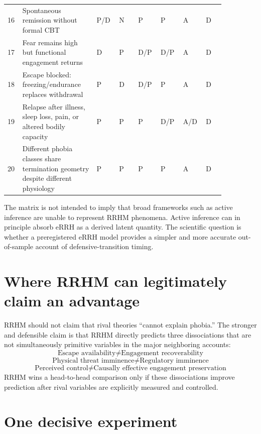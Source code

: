 \documentclass[10pt]{article}
\begin{document}
\begin{landscape}
\begin{longtable}{p{0.045\linewidth}p{0.31\linewidth}p{0.085\linewidth}p{0.085\linewidth}p{0.085\linewidth}p{0.085\linewidth}p{0.085\linewidth}p{0.085\linewidth}}
16 & Spontaneous remission without formal CBT & P/D & N & P & P & A & D \\
17 & Fear remains high but functional engagement returns & D & P & D/P & D/P & A & D \\
18 & Escape blocked: freezing/endurance replaces withdrawal & P & D & D/P & P & A & D \\
19 & Relapse after illness, sleep loss, pain, or altered bodily capacity & P & P & P & D/P & A/D & D \\
20 & Different phobia classes share termination geometry despite different physiology & P & P & P & P & A & D \\
\bottomrule
\end{longtable}
\normalsize
\end{landscape}

The matrix is not intended to imply that broad frameworks such as active inference are unable to represent RRHM phenomena. Active inference can in principle absorb eRRH as a derived latent quantity. The scientific question is whether a preregistered eRRH model provides a simpler and more accurate out-of-sample account of defensive-transition timing.

\section{Where RRHM can legitimately claim an advantage}
RRHM should not claim that rival theories ``cannot explain phobia.'' The stronger and defensible claim is that RRHM directly predicts three dissociations that are not simultaneously primitive variables in the major neighboring accounts:
\[
\boxed{\text{Escape availability}\neq\text{Engagement recoverability}}
\]
\[
\boxed{\text{Physical threat imminence}\neq\text{Regulatory imminence}}
\]
\[
\boxed{\text{Perceived control}\neq\text{Causally effective engagement preservation}}
\]
RRHM wins a head-to-head comparison only if these dissociations improve prediction after rival variables are explicitly measured and controlled.

\section{One decisive experiment}
\end{document}
